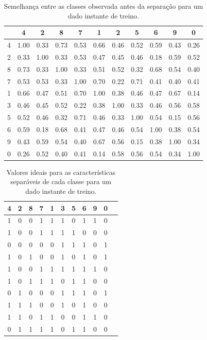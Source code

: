 \documentclass[conference]{IEEEtran}
\begin{document}
\begin{table}[h]
\caption{Semelhança entre as classes observada antes da separação para um dado instante de treino.}
\tabcolsep=0.18cm
\begin{center}
\begin{tabular}{c|cccccccccc}
   & 4 & 2 & 8 & 7 & 1 & 2 & 5 & 6 & 9 & 0 \\ \hline
4 & 1.00 & 0.33 & 0.73 & 0.53 & 0.66 & 0.46 & 0.52 & 0.59 & 0.43 & 0.26 \\
2 & 0.33 & 1.00 & 0.33 & 0.53 & 0.47 & 0.45 & 0.46 & 0.18 & 0.59 & 0.52 \\
8 & 0.73 & 0.33 & 1.00 & 0.33 & 0.51 & 0.52 & 0.32 & 0.68 & 0.54 & 0.40 \\
7 & 0.53 & 0.53 & 0.33 & 1.00 & 0.70 & 0.22 & 0.71 & 0.41 & 0.40 & 0.41 \\
1 & 0.66 & 0.47 & 0.51 & 0.70 & 1.00 & 0.38 & 0.46 & 0.47 & 0.67 & 0.14 \\
3 & 0.46 & 0.45 & 0.52 & 0.22 & 0.38 & 1.00 & 0.33 & 0.46 & 0.56 & 0.58 \\
5 & 0.52 & 0.46 & 0.32 & 0.71 & 0.46 & 0.33 & 1.00 & 0.54 & 0.15 & 0.56 \\
6 & 0.59 & 0.18 & 0.68 & 0.41 & 0.47 & 0.46 & 0.54 & 1.00 & 0.38 & 0.54 \\
9 & 0.43 & 0.59 & 0.54 & 0.40 & 0.67 & 0.56 & 0.15 & 0.38 & 1.00 & 0.34 \\
0 & 0.26 & 0.52 & 0.40 & 0.41 & 0.14 & 0.58 & 0.56 & 0.54 & 0.34 & 1.00
\end{tabular}
\label{taberr}
\end{center}
\end{table}

\begin{table}[h]
\caption{Valores ideais para as características separáveis de cada classe para um dado instante de treino.}
\tabcolsep=0.28cm
\begin{center}
\begin{tabular}{ccccccccccc}
\hline
4 & 2 & 8 & 7 & 1 & 3 & 5 & 6 & 9 & 0 \\ \hline
1 & 0 & 0 & 1 & 1 & 1 & 0 & 1 & 1 & 0 \\
1 & 0 & 0 & 1 & 1 & 1 & 1 & 0 & 0 & 0 \\
0 & 0 & 0 & 0 & 0 & 1 & 1 & 1 & 0 & 1 \\
1 & 0 & 1 & 0 & 0 & 1 & 0 & 1 & 0 & 1 \\
1 & 0 & 0 & 1 & 1 & 1 & 1 & 1 & 1 & 0 \\
1 & 0 & 1 & 1 & 1 & 0 & 1 & 1 & 0 & 0 \\
0 & 1 & 0 & 0 & 0 & 1 & 1 & 1 & 0 & 1 \\
1 & 1 & 1 & 0 & 0 & 1 & 0 & 1 & 0 & 0 \\
1 & 1 & 0 & 1 & 1 & 0 & 0 & 1 & 1 & 0 \\
0 & 1 & 1 & 1 & 1 & 0 & 1 & 1 & 0 & 0 \\ \hline
\end{tabular}
\label{tabFINAL}
\end{center}
\end{table}
\end{document}
